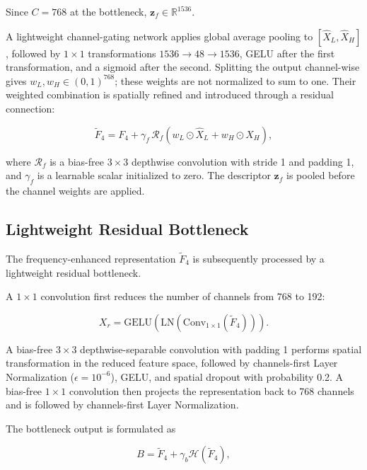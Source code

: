 Since $C=768$ at the bottleneck, $\mathbf{z}_f\in\mathbb{R}^{1536}$.

A lightweight channel-gating network applies global average pooling to
$[\widehat{X}_L,\widehat{X}_H]$, followed by $1\times1$ transformations
$1536\rightarrow48\rightarrow1536$, GELU after the first transformation, and a
sigmoid after the second. Splitting the output channel-wise gives
$w_L,w_H\in(0,1)^{768}$; these weights are not normalized to sum to one. Their
weighted combination is spatially refined and introduced through a residual connection:

\begin{equation}
\widetilde{F}_4
=
F_4+
\gamma_f\,\mathcal{R}_f
\left(
w_L\odot\widehat{X}_L+
w_H\odot\widehat{X}_H
\right),
\label{eq:fafem_residual_output}
\end{equation}

where $\mathcal{R}_f$ is a bias-free $3\times3$ depthwise convolution with stride 1
and padding 1, and $\gamma_f$ is a learnable scalar initialized to zero. The descriptor
$\mathbf{z}_f$ is pooled before the channel weights are applied.

\subsection{Lightweight Residual Bottleneck}

The frequency-enhanced representation $\widetilde{F}_4$ is subsequently processed by a lightweight residual bottleneck.

A $1\times1$ convolution first reduces the number of channels from 768 to 192:

\begin{equation}
X_r=\mathrm{GELU}\left(\mathrm{LN}\left(
\mathrm{Conv}_{1\times1}(\widetilde{F}_4)\right)\right).
\label{eq:bottleneck_reduction}
\end{equation}

A bias-free $3\times3$ depthwise-separable convolution with padding 1 performs spatial
transformation in the reduced feature space, followed by channels-first Layer
Normalization ($\epsilon=10^{-6}$), GELU, and spatial dropout with probability 0.2.
A bias-free $1\times1$ convolution then projects the representation back to 768
channels and is followed by channels-first Layer Normalization.

The bottleneck output is formulated as

\begin{equation}
B=
\widetilde{F}_4+
\gamma_b\mathcal{H}(\widetilde{F}_4),
\label{eq:lightweight_bottleneck}
\end{equation}

